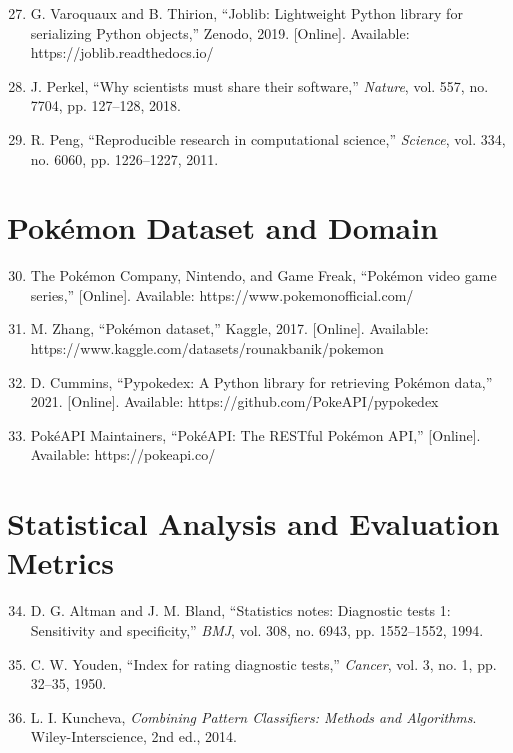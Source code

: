 \begin{enumerate}
  \setcounter{enumi}{26}
  \item G. Varoquaux and B. Thirion, ``Joblib: Lightweight Python library for serializing Python objects,'' Zenodo, 2019. [Online]. Available: https://joblib.readthedocs.io/
  
  \item J. Perkel, ``Why scientists must share their software,'' \textit{Nature}, vol. 557, no. 7704, pp. 127--128, 2018.
  
  \item R. Peng, ``Reproducible research in computational science,'' \textit{Science}, vol. 334, no. 6060, pp. 1226--1227, 2011.
\end{enumerate}

\section*{Pokémon Dataset and Domain}

\begin{enumerate}
  \setcounter{enumi}{29}
  \item The Pokémon Company, Nintendo, and Game Freak, ``Pokémon video game series,'' [Online]. Available: https://www.pokemonofficial.com/
  
  \item M. Zhang, ``Pokémon dataset,'' Kaggle, 2017. [Online]. Available: https://www.kaggle.com/datasets/rounakbanik/pokemon
  
  \item D. Cummins, ``Pypokedex: A Python library for retrieving Pokémon data,'' 2021. [Online]. Available: https://github.com/PokeAPI/pypokedex
  
  \item PokéAPI Maintainers, ``PokéAPI: The RESTful Pokémon API,'' [Online]. Available: https://pokeapi.co/
\end{enumerate}

\section*{Statistical Analysis and Evaluation Metrics}

\begin{enumerate}
  \setcounter{enumi}{33}
  \item D. G. Altman and J. M. Bland, ``Statistics notes: Diagnostic tests 1: Sensitivity and specificity,'' \textit{BMJ}, vol. 308, no. 6943, pp. 1552--1552, 1994.
  
  \item C. W. Youden, ``Index for rating diagnostic tests,'' \textit{Cancer}, vol. 3, no. 1, pp. 32--35, 1950.
  
  \item L. I. Kuncheva, \textit{Combining Pattern Classifiers: Methods and Algorithms}. Wiley-Interscience, 2nd ed., 2014.
\end{enumerate}

